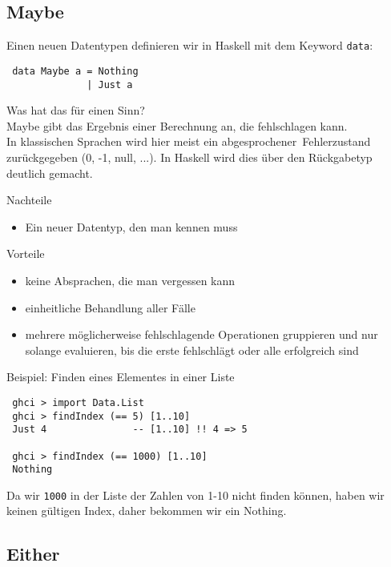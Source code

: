 \documentclass{beamer}
\begin{document}
\subsection{Maybe}
\begin{frame}[fragile]
 Einen neuen Datentypen definieren wir in Haskell mit dem Keyword \texttt{data}:
 \begin{verbatim}
 data Maybe a = Nothing
              | Just a
 \end{verbatim}
 \pause
 Was hat das für einen Sinn?\\
 \pause
 Maybe gibt das Ergebnis einer Berechnung an, die fehlschlagen kann.\\
 In klassischen Sprachen wird hier meist ein \glqq abgesprochener\grqq \ Fehlerzustand zurückgegeben (0, -1, null, ...). In Haskell wird dies über den Rückgabetyp deutlich gemacht.
\end{frame}

\begin{frame}[fragile]
 Nachteile
 \begin{itemize}
  \item Ein neuer Datentyp, den man kennen muss
 \end{itemize}
 \pause
 Vorteile
 \begin{itemize}
  \item keine Absprachen, die man vergessen kann
  \item einheitliche Behandlung aller Fälle
  \item mehrere möglicherweise fehlschlagende Operationen gruppieren und nur solange evaluieren, bis die erste fehlschlägt oder alle erfolgreich sind
 \end{itemize}
\end{frame}

\begin{frame}[fragile]
 Beispiel: Finden eines Elementes in einer Liste
 \pause
 \begin{verbatim}
 ghci > import Data.List
 ghci > findIndex (== 5) [1..10]
 Just 4               -- [1..10] !! 4 => 5
 
 ghci > findIndex (== 1000) [1..10]
 Nothing
 \end{verbatim}
 \pause
 Da wir \texttt{1000} in der Liste der Zahlen von 1-10 nicht finden können, haben wir keinen gültigen Index, daher bekommen wir ein Nothing.
\end{frame}

\subsection{Either}
\end{document}
